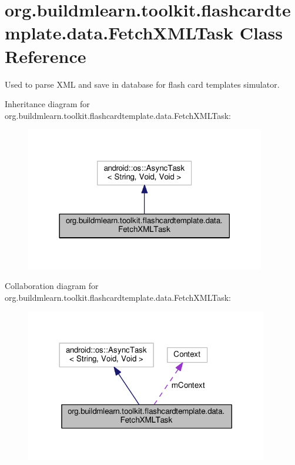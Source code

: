 \hypertarget{classorg_1_1buildmlearn_1_1toolkit_1_1flashcardtemplate_1_1data_1_1FetchXMLTask}{}\section{org.\+buildmlearn.\+toolkit.\+flashcardtemplate.\+data.\+Fetch\+X\+M\+L\+Task Class Reference}
\label{classorg_1_1buildmlearn_1_1toolkit_1_1flashcardtemplate_1_1data_1_1FetchXMLTask}


Used to parse X\+ML and save in database for flash card template\textquotesingle{}s simulator.  




Inheritance diagram for org.\+buildmlearn.\+toolkit.\+flashcardtemplate.\+data.\+Fetch\+X\+M\+L\+Task\+:
\nopagebreak
\begin{figure}[H]
\begin{center}
\leavevmode
\includegraphics[width=297pt]{classorg_1_1buildmlearn_1_1toolkit_1_1flashcardtemplate_1_1data_1_1FetchXMLTask__inherit__graph}
\end{center}
\end{figure}


Collaboration diagram for org.\+buildmlearn.\+toolkit.\+flashcardtemplate.\+data.\+Fetch\+X\+M\+L\+Task\+:
\nopagebreak
\begin{figure}[H]
\begin{center}
\leavevmode
\includegraphics[width=300pt]{classorg_1_1buildmlearn_1_1toolkit_1_1flashcardtemplate_1_1data_1_1FetchXMLTask__coll__graph}
\end{center}
\end{figure}
